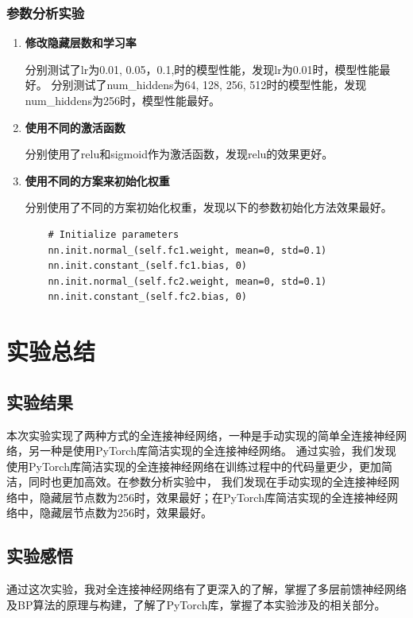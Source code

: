 \documentclass[12pt]{article}
\begin{document}
\subsubsection{参数分析实验}

\begin{enumerate}
  \item \textbf{修改隐藏层数和学习率}

        分别测试了lr为0.01, 0.05，0.1,时的模型性能，发现lr为0.01时，模型性能最好。
        分别测试了num\_hiddens为64, 128, 256, 512时的模型性能，发现num\_hiddens为256时，模型性能最好。
  \item \textbf{使用不同的激活函数}

        分别使用了relu和sigmoid作为激活函数，发现relu的效果更好。
  \item \textbf{使用不同的方案来初始化权重}
         
        分别使用了不同的方案初始化权重，发现以下的参数初始化方法效果最好。
  \begin{lstlisting}
    # Initialize parameters
    nn.init.normal_(self.fc1.weight, mean=0, std=0.1)
    nn.init.constant_(self.fc1.bias, 0)
    nn.init.normal_(self.fc2.weight, mean=0, std=0.1)
    nn.init.constant_(self.fc2.bias, 0)
  \end{lstlisting}
        
\end{enumerate}


\section{实验总结}

\subsection{实验结果}
本次实验实现了两种方式的全连接神经网络，一种是手动实现的简单全连接神经网络，另一种是使用PyTorch库简洁实现的全连接神经网络。
通过实验，我们发现使用PyTorch库简洁实现的全连接神经网络在训练过程中的代码量更少，更加简洁，同时也更加高效。在参数分析实验中，
我们发现在手动实现的全连接神经网络中，隐藏层节点数为256时，效果最好；在PyTorch库简洁实现的全连接神经网络中，隐藏层节点数为256时，效果最好。

\subsection{实验感悟}
通过这次实验，我对全连接神经网络有了更深入的了解，掌握了多层前馈神经网络及BP算法的原理与构建，了解了PyTorch库，掌握了本实验涉及的相关部分。
\end{document}
